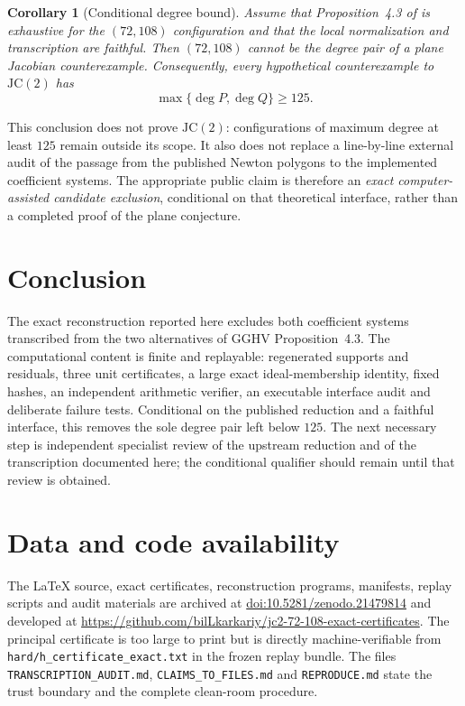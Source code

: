 \documentclass[11pt,a4paper]{article}
\newtheorem{corollary}[theorem]{Corollary}
\theoremstyle{remark}
\newcommand{\JC}{\mathrm{JC}}
\begin{document}
\begin{corollary}[Conditional degree bound]
Assume that Proposition~4.3 of \cite{GGHV2022} is exhaustive for the $(72,108)$ configuration and that the local normalization and transcription are faithful. Then $(72,108)$ cannot be the degree pair of a plane Jacobian counterexample. Consequently, every hypothetical counterexample to $\JC(2)$ has
\[
\max\{\deg P,\deg Q\}\geq125.
\]
\end{corollary}

This conclusion does not prove $\JC(2)$: configurations of maximum degree at least $125$ remain outside its scope. It also does not replace a line-by-line external audit of the passage from the published Newton polygons to the implemented coefficient systems. The appropriate public claim is therefore an \emph{exact computer-assisted candidate exclusion}, conditional on that theoretical interface, rather than a completed proof of the plane conjecture.

\section{Conclusion}

The exact reconstruction reported here excludes both coefficient systems transcribed from the two alternatives of GGHV Proposition~4.3. The computational content is finite and replayable: regenerated supports and residuals, three unit certificates, a large exact ideal-membership identity, fixed hashes, an independent arithmetic verifier, an executable interface audit and deliberate failure tests. Conditional on the published reduction and a faithful interface, this removes the sole degree pair left below $125$. The next necessary step is independent specialist review of the upstream reduction and of the transcription documented here; the conditional qualifier should remain until that review is obtained.

\section*{Data and code availability}
The LaTeX source, exact certificates, reconstruction programs, manifests, replay scripts and audit materials are archived at \href{https://doi.org/10.5281/zenodo.21479814}{doi:10.5281/zenodo.21479814} and developed at \url{https://github.com/bilLkarkariy/jc2-72-108-exact-certificates}. The principal certificate is too large to print but is directly machine-verifiable from \texttt{hard/h\_certificate\_exact.txt} in the frozen replay bundle. The files \texttt{TRANSCRIPTION\_AUDIT.md}, \texttt{CLAIMS\_TO\_FILES.md} and \texttt{REPRODUCE.md} state the trust boundary and the complete clean-room procedure.
\end{document}
